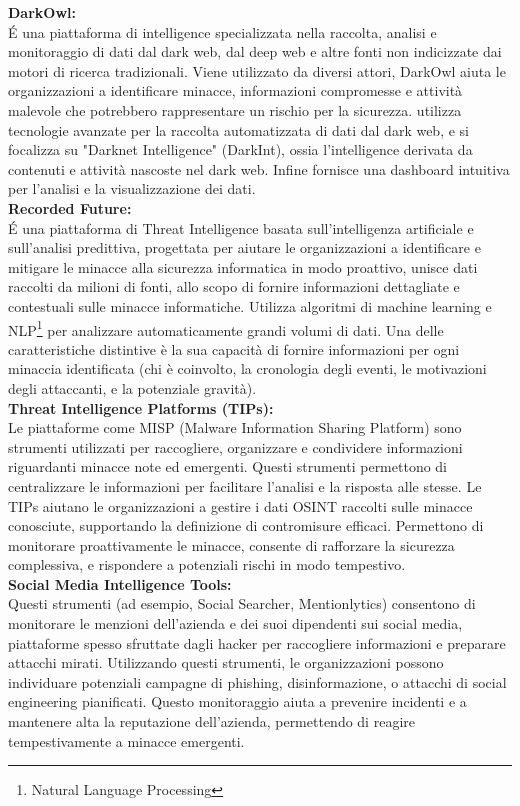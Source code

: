 \textbf{DarkOwl:}\\
\'E una piattaforma di intelligence specializzata nella raccolta, analisi e monitoraggio di dati dal dark web, dal deep web e altre fonti non indicizzate dai motori di ricerca tradizionali. Viene utilizzato da diversi attori, DarkOwl aiuta le organizzazioni a identificare minacce, informazioni compromesse e attività malevole che potrebbero rappresentare un rischio per la sicurezza.
utilizza tecnologie avanzate per la raccolta automatizzata di dati dal dark web, e si focalizza su "Darknet Intelligence" (DarkInt), ossia l'intelligence derivata da contenuti e attività nascoste nel dark web. Infine fornisce una dashboard intuitiva per l'analisi e la visualizzazione dei dati.\\


\textbf{Recorded Future:}\\
\'E una piattaforma di Threat Intelligence basata sull'intelligenza artificiale e sull'analisi predittiva, progettata per aiutare le organizzazioni a identificare e mitigare le minacce alla sicurezza informatica in modo proattivo, unisce dati raccolti da milioni di fonti, allo scopo di fornire informazioni dettagliate e contestuali sulle minacce informatiche. Utilizza algoritmi di machine learning e NLP\footnote{Natural Language Processing} per analizzare automaticamente grandi volumi di dati. Una delle caratteristiche distintive è la sua capacità di fornire informazioni per ogni minaccia identificata (chi è coinvolto, la cronologia degli eventi, le motivazioni degli attaccanti, e la potenziale gravità).\\


\textbf{Threat Intelligence Platforms (TIPs):}\\
Le piattaforme come MISP (Malware Information Sharing Platform) sono strumenti utilizzati per raccogliere, organizzare e condividere informazioni riguardanti minacce note ed emergenti. Questi strumenti permettono di centralizzare le informazioni per facilitare l'analisi e la risposta alle stesse.
Le TIPs aiutano le organizzazioni a gestire i dati OSINT raccolti sulle minacce conosciute, supportando la definizione di contromisure efficaci. Permettono di monitorare proattivamente le minacce, consente di rafforzare la sicurezza complessiva, e rispondere a potenziali rischi in modo tempestivo.\\


\textbf{Social Media Intelligence Tools:}\\
Questi strumenti (ad esempio, Social Searcher, Mentionlytics) consentono di monitorare le menzioni dell'azienda e dei suoi dipendenti sui social media, piattaforme spesso sfruttate dagli hacker per raccogliere informazioni e preparare attacchi mirati.
Utilizzando questi strumenti, le organizzazioni possono individuare potenziali campagne di phishing, disinformazione, o attacchi di social engineering pianificati. Questo monitoraggio aiuta a prevenire incidenti e a mantenere alta la reputazione dell'azienda, permettendo di reagire tempestivamente a minacce emergenti.\\


